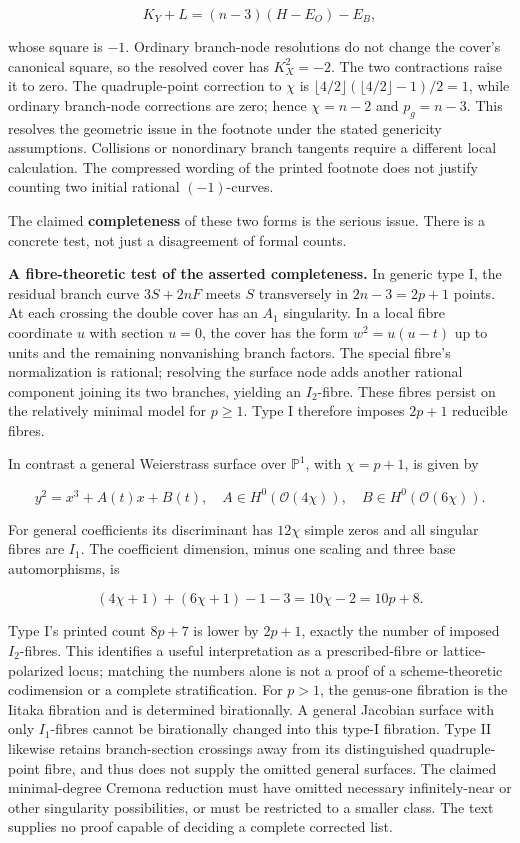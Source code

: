 \[
K_Y+L=(n-3)(H-E_O)-E_B,
\]

whose square is \(-1\). Ordinary branch-node resolutions do not change the cover's canonical square, so the resolved cover has \(K_X^2=-2\). The two contractions raise it to zero. The quadruple-point correction to \(\chi\) is \(\lfloor4/2\rfloor(\lfloor4/2\rfloor-1)/2=1\), while ordinary branch-node corrections are zero; hence \(\chi=n-2\) and \(p_g=n-3\). This resolves the geometric issue in the footnote under the stated genericity assumptions. Collisions or nonordinary branch tangents require a different local calculation. The compressed wording of the printed footnote does not justify counting two initial rational \((-1)\)-curves.

The claimed \textbf{completeness} of these two forms is the serious issue. There is a concrete test, not just a disagreement of formal counts.

\textbf{A fibre-theoretic test of the asserted completeness.} In generic type I, the residual branch curve \(3S+2nF\) meets \(S\) transversely in \(2n-3=2p+1\) points. At each crossing the double cover has an \(A_1\) singularity. In a local fibre coordinate \(u\) with section \(u=0\), the cover has the form \(w^2=u(u-t)\) up to units and the remaining nonvanishing branch factors. The special fibre's normalization is rational; resolving the surface node adds another rational component joining its two branches, yielding an \(I_2\)-fibre. These fibres persist on the relatively minimal model for \(p\ge1\). Type I therefore imposes \(2p+1\) reducible fibres.

In contrast a general Weierstrass surface over \(\mathbb P^1\), with \(\chi=p+1\), is given by

\[
y^2=x^3+A(t)x+B(t),\quad
A\in H^0(\mathcal O(4\chi)),\quad B\in H^0(\mathcal O(6\chi)).
\]

For general coefficients its discriminant has \(12\chi\) simple zeros and all singular fibres are \(I_1\). The coefficient dimension, minus one scaling and three base automorphisms, is

\[
(4\chi+1)+(6\chi+1)-1-3=10\chi-2=10p+8.
\]

Type I's printed count \(8p+7\) is lower by \(2p+1\), exactly the number of imposed \(I_2\)-fibres. This identifies a useful interpretation as a prescribed-fibre or lattice-polarized locus; matching the numbers alone is not a proof of a scheme-theoretic codimension or a complete stratification. For \(p>1\), the genus-one fibration is the Iitaka fibration and is determined birationally. A general Jacobian surface with only \(I_1\)-fibres cannot be birationally changed into this type-I fibration. Type II likewise retains branch-section crossings away from its distinguished quadruple-point fibre, and thus does not supply the omitted general surfaces. The claimed minimal-degree Cremona reduction must have omitted necessary infinitely-near or other singularity possibilities, or must be restricted to a smaller class. The text supplies no proof capable of deciding a complete corrected list.

